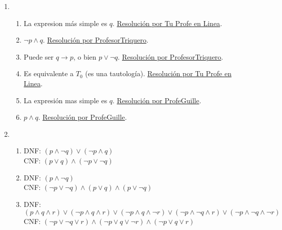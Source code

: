 \documentclass[a4paper]{article}
\newcommand{\exercise}{\item}
\newcommand{\then}{\to}
\begin{document}
\begin{enumerate}
\begin{enumerate} [label=(\alph*)]
		\item La \href{https://www.wolframalpha.com/input?i=%28p+%3D%3E+q%29+%3C%3D%3E+%28%28p+and+not+q%29+%3D%3E+r%29}{tabla de verdad (ver dónde r es F)} revela que es una tautología. Por lo tanto, son equivalentes. Esta regla de equivalencia se llama Reducción al absurdo.
		\item La \href{https://www.wolframalpha.com/input?i=%28%28p+and+q%29+%3D%3E+r%29%3C%3D%3E+%28p+%3D%3E+%28q+%3D%3Er%29%29}{tabla de verdad} revela que es una tautología. Por lo tanto, son equivalentes. Esta regla de equivalencia se llama Exportación.
		\item La \href{https://www.wolframalpha.com/input?i=%28%28p+or+q+%29+%3D%3E++r%29+%3C%3D%3E+%28+%28p+%3D%3E+r%29+and+%28q+%3D%3E+r%29+%29}{tabla de verdad} revela que es una tautología. Por lo tanto, son equivalentes. Esta regla de equivalencia se llama Demostración por casos.
\end{enumerate}\exercise\begin{enumerate} [label=(\alph*)]		\item La expresion más simple es $q$. \href{https://youtu.be/BOydu7cpv70}{Resolución por Tu Profe en Linea}.
		\item $\neg p \land q$. \href{https://youtu.be/p005yi28rgk?t=737}{Resolución por ProfesorTriquero}.
		\item Puede ser $q \then p$, o bien $p \lor \neg q$. \href{https://youtu.be/p005yi28rgk?t=995}{Resolución por ProfesorTriquero}.
		\item Es equivalente a $T_0$ (es una tautología). \href{https://youtu.be/BOydu7cpv70?t=586}{Resolución por Tu Profe en Linea}.
		\item La expresión mas simple es $q$. \href{https://youtu.be/KyIdCTWZuJ8}{Resolución por ProfeGuille}.
		\item $p \land q$. \href{https://youtu.be/shOOoVRqKcA}{Resolución por ProfeGuille}.
\end{enumerate}\exercise\begin{enumerate} [label=(\alph*)]		\item DNF: $(p\land \neg q) \lor  (\neg p\land q)$ \\ CNF: $(p\lor q) \land  (\neg p\lor \neg q)$
		\item DNF: $(p\land \neg q)$  \\ CNF: $(\neg p\lor \neg q) \land  (p\lor q) \land  (p\lor \neg q)$
		\item DNF: $(p\land q\land r) \lor  (\neg p\land q\land r) \lor  (\neg p\land q\land \neg r) \lor  (\neg p\land \neg q\land r) \lor  (\neg p\land \neg q\land \neg r)$  \\ CNF: $(\neg p\lor \neg q\lor r) \land  (\neg p\lor q\lor \neg r) \land  (\neg p\lor q\lor r)$

\end{enumerate}
\end{enumerate}
\end{document}
